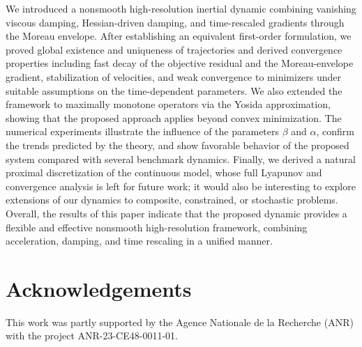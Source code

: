 \documentclass[11pt]{article}
\numberwithin{equation}{section}
\begin{document}
We introduced a nonsmooth high-resolution inertial dynamic combining vanishing viscous damping, Hessian-driven damping, and time-rescaled gradients through the Moreau envelope. After establishing an equivalent first-order formulation, we proved global existence and uniqueness of trajectories and derived convergence properties including fast decay of the objective residual and the Moreau-envelope gradient, stabilization of velocities, and weak convergence to minimizers under suitable assumptions on the time-dependent parameters. We also extended the framework to maximally monotone operators via the Yosida approximation, showing that the proposed approach applies beyond convex minimization. The numerical experiments illustrate the influence of the parameters \(\beta\) and \(\alpha\), confirm the trends predicted by the theory, and show favorable behavior of the proposed system compared with several benchmark dynamics. Finally, we derived a natural proximal discretization of the continuous model, whose full Lyapunov and convergence analysis is left for future work; it would also be interesting to explore extensions of our dynamics to composite, constrained, or stochastic problems. Overall, the results of this paper indicate that the proposed dynamic provides a flexible and effective nonsmooth high-resolution framework, combining acceleration, damping, and time rescaling in a unified manner.

\section*{Acknowledgements}

This work was partly supported by the Agence Nationale de la Recherche (ANR) with the project ANR-23-CE48-0011-01.
\end{document}
